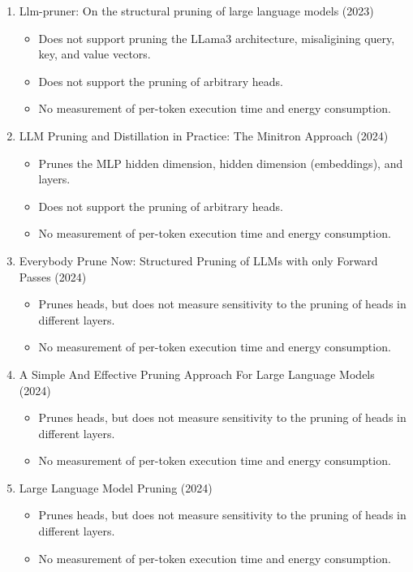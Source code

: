 \documentclass[conference]{IEEEtran}
\begin{document}
    \begin{enumerate}
        \item Llm-pruner: On the structural pruning of large language models (2023)~\cite{ma2023llm}
        \begin{itemize}
            \item Does not support pruning the LLama3 architecture, misaligining query, key, and value vectors.
            \item Does not support the pruning of arbitrary heads.
            \item No measurement of per-token execution time and energy consumption.
        \end{itemize}
        \item LLM Pruning and Distillation in Practice: The Minitron Approach (2024)~\cite{sreenivas2024llm}
        \begin{itemize}
            \item Prunes the MLP hidden dimension, hidden dimension (embeddings), and layers.
            \item Does not support the pruning of arbitrary heads.
            \item No measurement of per-token execution time and energy consumption.
        \end{itemize}
        \item Everybody Prune Now: Structured Pruning of LLMs with only Forward Passes (2024)~\cite{dery2024everybodyprunenowstructured}
        \begin{itemize}
            \item Prunes heads, but does not measure sensitivity to the pruning of heads in different layers.
            \item No measurement of per-token execution time and energy consumption.
        \end{itemize}
        \item A Simple And Effective Pruning Approach For Large Language Models (2024) ~\cite{sun2024simpleeffectivepruningapproach}
        \begin{itemize}
            \item Prunes heads, but does not measure sensitivity to the pruning of heads in different layers.
            \item No measurement of per-token execution time and energy consumption.
        \end{itemize}
        \item Large Language Model Pruning (2024) ~\cite{huang2024largelanguagemodelpruning}
        \begin{itemize}
            \item Prunes heads, but does not measure sensitivity to the pruning of heads in different layers.
            \item No measurement of per-token execution time and energy consumption.
        \end{itemize}
    \end{enumerate}
\end{document}
